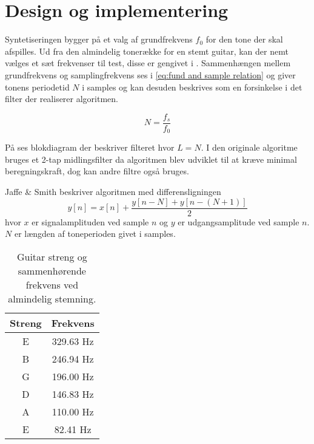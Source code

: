 \section{Design og implementering}

Syntetiseringen bygger på et valg af grundfrekvens \(f_0\) for den tone der skal afspilles.
Ud fra den almindelig tonerække for en stemt guitar\cite{GuitarTunings}, kan der nemt vælges et sæt frekvenser til test, disse er gengivet i .
Sammenhængen mellem grundfrekvens og samplingfrekvens ses i \eqref{eq:fund and sample relation} og giver tonens periodetid \(N\) i samples og kan desuden beskrives som en forsinkelse i det filter der realiserer algoritmen.

\begin{equation}\label{eq:fund and sample relation}
  N = \frac{f_s}{f_0}
\end{equation}

På  ses blokdiagram der beskriver filteret hvor \(L = N\). I den originale algoritme bruges et 2-tap midlingsfilter da algoritmen blev udviklet til at kræve minimal beregningskraft\cite{Karplus1983}, dog kan andre filtre også bruges.


Jaffe \& Smith beskriver algoritmen med differensligningen
\begin{equation}\label{eq:JaffeString}
  y[n] = x[n] + \frac{y[n - N] + y\left[n -(N + 1)\right]}{2}
\end{equation}
hvor \(x\) er signalamplituden ved sample \(n\) og \(y\) er udgangsamplitude ved sample \(n\).
\(N\) er længden af toneperioden givet i samples\cite{Jaffe1983}.

\begin{table}[]
  \centering
  \caption{Guitar streng og sammenhørende frekvens ved almindelig stemning\cite{GuitarTunings}.}
  \label{tab:guitar tunings}
  \begin{tabular}{cc}
    \toprule
    Streng & Frekvens  \\ \midrule
    E      & 329.63 Hz \\
    B      & 246.94 Hz \\
    G      & 196.00 Hz \\
    D      & 146.83 Hz \\
    A      & 110.00 Hz \\
    E      & 82.41 Hz  \\ \bottomrule
  \end{tabular}
\end{table}

